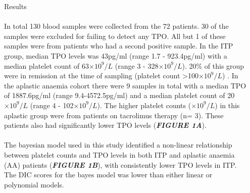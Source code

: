 \documentclass[landscape,a0paper,fontscale=0.285]{beamer} %
\newlength{\onecolwid}
\newlength{\twocolwid}
\begin{document}
\begin{frame}[t]
\begin{columns}[t]
\begin{column}{\twocolwid}
\begin{columns}[t,totalwidth=\twocolwid]
\begin{column}{\onecolwid}
\begin{block}{Results}
\paragraph{} In total 130 blood samples were collected from the 72 patients. 30 of the samples were excluded for failing to detect any TPO. All but 1 of these samples were from patients who had a second positive sample. In the ITP group, median TPO levels was 43pg/ml (range 1.7 - 923.4pg/ml) with a median platelet count of 63$\times 10^9/L$ (range 3 - 328$\times 10^9/L$). 20\% of this group were in remission at the time of sampling (platelet count >100$\times 10^9/L$) . In the aplastic anaemia cohort there were 9 samples in total with a median TPO of 1887.6pg/ml (range 9.4-4572.5pg/ml) and a median platelet count of 20$\times 10^9/L$ (range 4 - 102$\times 10^9/L$). The higher platelet counts ($\times 10^9/L$) in this aplastic group were from patients on tacrolimus therapy (n= 3). These patients also had significantly lower TPO levels (\textit{\textbf{FIGURE 1A}}). 

\vspace{30pt}

\paragraph{} The bayesian model used in this study identified a non-linear relationship between platelet counts and TPO levels in both ITP and aplastic anaemia (AA) patients (\textbf{\emph{FIGURE 1B}}), with consistently lower TPO levels in ITP. The DIC scores for the bayes model was lower than either linear or polynomial models.

\end{block}



\end{column} %

\begin{column}{\onecolwid} %


\end{column}
\end{columns}
\end{column}
\end{columns}
\end{frame}
\end{document}

